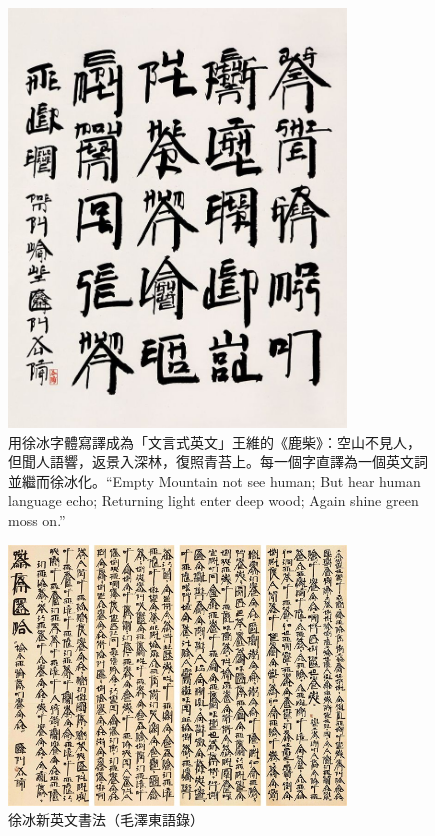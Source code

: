 \documentclass[a5paper, 12pt, openany]{book} %
\begin{document}
\begin{figure}[H]
  \centering
  \includegraphics[width=0.8\textwidth]{./images/xubing_1.png}
  \caption{用徐冰字體寫譯成為「文言式英文」王維的《鹿柴》：空山不見人，但聞人語響，返景入深林，復照青苔上。每一個字直譯為一個英文詞並繼而徐冰化。“Empty Mountain not see human; But hear human language echo; Returning light enter deep wood; Again shine green moss on.”
  }
  \label{fig:xubing_1}
\end{figure}

\begin{figure}[H]
  \centering
  \includegraphics[width=0.8\textwidth]{./images/xubing_2.png}
  \caption{徐冰新英文書法（毛澤東語錄）}
  \label{fig:xubing_2}
\end{figure}
\end{document}

